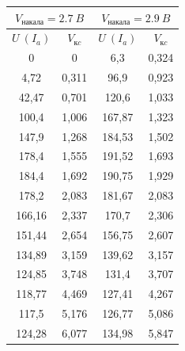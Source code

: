 \documentclass[a4paper, 12pt]{article}
\begin{document}
\begin{table}[h!]
\begin{center}
\begin{tabular}{|cc|cc|}
\hline
\multicolumn{2}{|c|}{$V_{накала} = 2.7~B$}                        & \multicolumn{2}{c|}{$V_{накала} = 2.9~B$}                        \\ \hline
\multicolumn{1}{|c|}{$U~(I_a)$} & $V_{кc}$ & \multicolumn{1}{c|}{$U~(I_a)$} & $V_{кc}$ \\ \hline
\multicolumn{1}{|c|}{0}            & 0         & \multicolumn{1}{c|}{6,3}          & 0,324     \\ \hline
\multicolumn{1}{|c|}{4,72}         & 0,311     & \multicolumn{1}{c|}{96,9}         & 0,923     \\ \hline
\multicolumn{1}{|c|}{42,47}        & 0,701     & \multicolumn{1}{c|}{120,6}        & 1,033     \\ \hline
\multicolumn{1}{|c|}{100,4}        & 1,006     & \multicolumn{1}{c|}{167,87}       & 1,323     \\ \hline
\multicolumn{1}{|c|}{147,9}        & 1,268     & \multicolumn{1}{c|}{184,53}       & 1,502     \\ \hline
\multicolumn{1}{|c|}{178,4}        & 1,555     & \multicolumn{1}{c|}{191,52}       & 1,693     \\ \hline
\multicolumn{1}{|c|}{184,4}        & 1,692     & \multicolumn{1}{c|}{190,75}       & 1,929     \\ \hline
\multicolumn{1}{|c|}{178,2}        & 2,083     & \multicolumn{1}{c|}{181,67}       & 2,083     \\ \hline
\multicolumn{1}{|c|}{166,16}       & 2,337     & \multicolumn{1}{c|}{170,7}        & 2,306     \\ \hline
\multicolumn{1}{|c|}{151,44}       & 2,654     & \multicolumn{1}{c|}{156,75}       & 2,607     \\ \hline
\multicolumn{1}{|c|}{134,89}       & 3,159     & \multicolumn{1}{c|}{139,62}       & 3,157     \\ \hline
\multicolumn{1}{|c|}{124,85}       & 3,748     & \multicolumn{1}{c|}{131,4}        & 3,707     \\ \hline
\multicolumn{1}{|c|}{118,77}       & 4,469     & \multicolumn{1}{c|}{127,41}       & 4,267     \\ \hline
\multicolumn{1}{|c|}{117,5}        & 5,176     & \multicolumn{1}{c|}{126,77}       & 5,086     \\ \hline
\multicolumn{1}{|c|}{124,28}       & 6,077     & \multicolumn{1}{c|}{134,98}       & 5,847     \\ \hline

\end{tabular}
\end{center}
\end{table}
\end{document}
